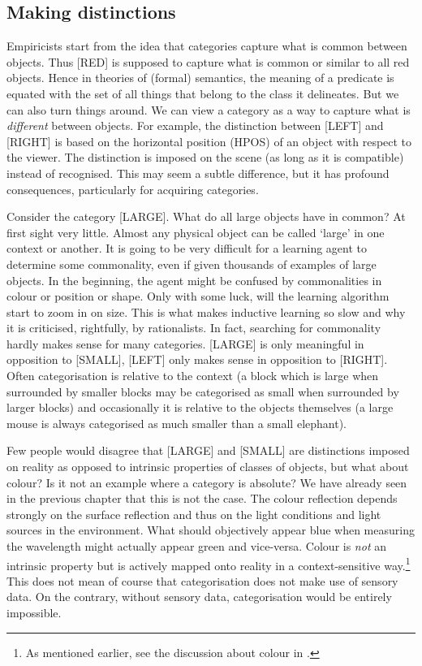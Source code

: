 \subsection{Making distinctions}

Empiricists start from the idea that categories 
capture what is common
between objects. Thus [RED] is supposed to capture 
what is common or similar to all 
red objects. Hence in theories of 
(formal) semantics, the meaning of a predicate is 
equated with the set of all things that 
belong to the class it delineates. 
But we can also turn things around. We can 
view a category as a way to capture what is {\itshape different} 
between objects. For example, the distinction between 
[LEFT] and [RIGHT] is based on the horizontal position (HPOS)
of an object with respect to the viewer. 
The distinction is imposed on the scene (as long as 
it is compatible) instead of 
recognised. This may seem a subtle difference, but it
has profound consequences, particularly for acquiring
categories.

Consider the category [LARGE]. What do all large 
objects have in common? At first sight very little. 
Almost any physical object can be called `large' in 
one context or another. 
It is going to be very difficult for a learning agent
to determine some commonality, even if given thousands 
of examples of large objects. In the beginning, the agent
might be confused by commonalities in 
colour or position or shape. 
Only with some luck, will the learning algorithm
start to zoom in on size. 
This is what makes inductive learning so slow and 
why it is criticised, rightfully, by rationalists. 
In fact, searching for commonality hardly makes sense for
many categories. [LARGE] is only meaningful in
opposition to [SMALL], [LEFT] only makes sense
in opposition to [RIGHT]. Often categorisation
is relative to the context (a block which is large when surrounded
by smaller blocks may be categorised as
small when surrounded by larger
blocks) and occasionally it is relative to the objects themselves
(a large mouse is always categorised as
much smaller than a small elephant). 

Few people would disagree that [LARGE] and [SMALL] are
distinctions imposed on reality as opposed to intrinsic
properties of classes of objects, but what about colour? Is it
not an example where a category is absolute? We have 
already seen in the previous chapter that this is not 
the case. The colour reflection depends strongly on the 
surface reflection and thus on the light conditions and
light sources in the environment. What should objectively 
appear blue when measuring the wavelength might actually 
appear green and vice-versa. Colour is {\itshape not}
an intrinsic property but is actively mapped onto reality
in a context-sensitive way.\footnote{
As mentioned earlier, see the discussion about colour 
in \cite{Varela:1991}.}
This does not mean of course that categorisation does not make use of sensory
data. On the contrary, without sensory data, categorisation
would be entirely impossible. 

